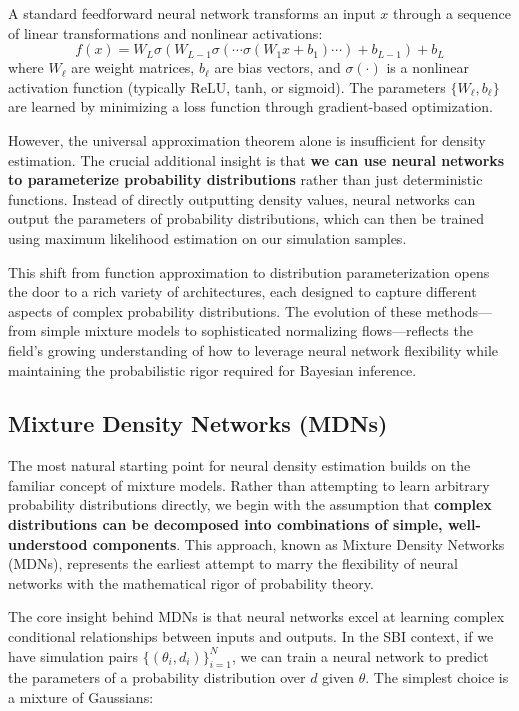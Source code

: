 \documentclass{SciPost}
\begin{document}
A standard feedforward neural network transforms an input $x$ through a sequence of linear transformations and nonlinear activations:
\begin{equation}
    f(x) = W_L \sigma(W_{L-1} \sigma(\cdots \sigma(W_1 x + b_1) \cdots) + b_{L-1}) + b_L
\end{equation}
where $W_\ell$ are weight matrices, $b_\ell$ are bias vectors, and $\sigma(\cdot)$ is a nonlinear activation function (typically ReLU, tanh, or sigmoid). The parameters $\{W_\ell, b_\ell\}$ are learned by minimizing a loss function through gradient-based optimization.

However, the universal approximation theorem alone is insufficient for density estimation. The crucial additional insight is that \textbf{we can use neural networks to parameterize probability distributions} rather than just deterministic functions. Instead of directly outputting density values, neural networks can output the parameters of probability distributions, which can then be trained using maximum likelihood estimation on our simulation samples.

This shift from function approximation to distribution parameterization opens the door to a rich variety of architectures, each designed to capture different aspects of complex probability distributions. The evolution of these methods—from simple mixture models to sophisticated normalizing flows—reflects the field's growing understanding of how to leverage neural network flexibility while maintaining the probabilistic rigor required for Bayesian inference.

\subsection{Mixture Density Networks (MDNs)}

The most natural starting point for neural density estimation builds on the familiar concept of mixture models. Rather than attempting to learn arbitrary probability distributions directly, we begin with the assumption that \textbf{complex distributions can be decomposed into combinations of simple, well-understood components}. This approach, known as Mixture Density Networks (MDNs), represents the earliest attempt to marry the flexibility of neural networks with the mathematical rigor of probability theory.

The core insight behind MDNs is that neural networks excel at learning complex conditional relationships between inputs and outputs. In the SBI context, if we have simulation pairs $\{(\theta_i, d_i)\}_{i=1}^N$, we can train a neural network to predict the parameters of a probability distribution over $d$ given $\theta$. The simplest choice is a mixture of Gaussians:
\end{document}
